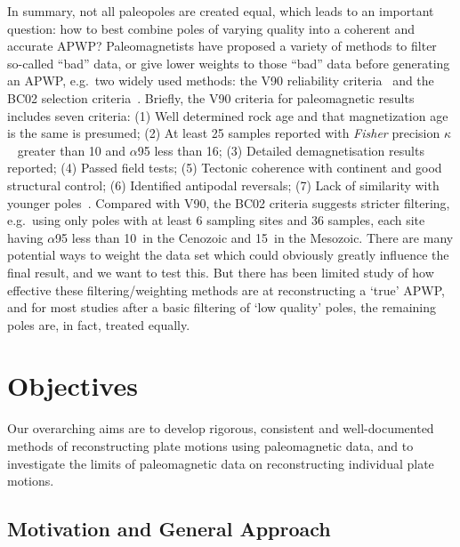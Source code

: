 In summary, not all paleopoles are created equal, which leads to an important
question: how to best combine poles of varying quality into a coherent and
accurate APWP\@? Paleomagnetists have proposed a variety of methods to filter
so-called ``bad'' data, or give lower weights to those ``bad'' data before
generating an APWP, e.g.\ two widely used methods: the V90 reliability
criteria~\citep{v90} and the BC02 selection criteria~\citep{B02}. Briefly, the
V90 criteria for paleomagnetic results includes seven criteria: (1) Well
determined rock age and that magnetization age is the same is presumed; (2) At
least 25 samples reported with \emph{Fisher} precision $\kappa$~\citep{F53} greater
than 10 and $\alpha$95 less than 16\degree; (3) Detailed demagnetisation results
reported; (4) Passed field tests; (5) Tectonic coherence with continent and good
structural control; (6) Identified antipodal reversals; (7) Lack of similarity
with younger poles~\citep{T92}. Compared with V90, the BC02 criteria suggests
stricter filtering, e.g.\ using only poles with at least 6 sampling sites and 36
samples, each site having $\alpha$95 less than 10\degree\ in the Cenozoic and
15\degree\ in the Mesozoic. There are many potential ways to weight the data set
which could obviously greatly influence the final result, and we want to test
this. But there has been limited study of how effective these
filtering/weighting methods are at reconstructing a `true' APWP, and for most
studies after a basic filtering of `low quality' poles, the remaining poles are,
in fact, treated equally.

\section{Objectives}

Our overarching aims are to develop rigorous, consistent and well-documented
methods of reconstructing plate motions using paleomagnetic data, and to
investigate the limits of paleomagnetic data on reconstructing individual plate
motions.

\subsection{Motivation and General Approach}

